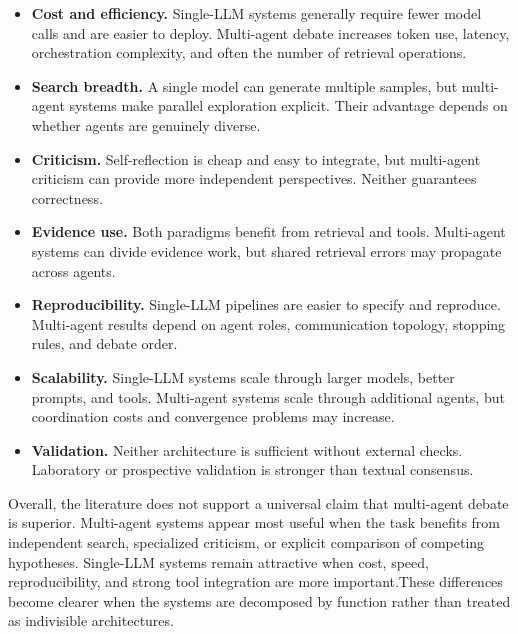 \documentclass[11pt]{article}
\begin{document}
\begin{itemize}
  \item \textbf{Cost and efficiency.} Single-LLM systems generally require fewer model calls and are
  easier to deploy. Multi-agent debate increases token use, latency, orchestration complexity, and
  often the number of retrieval operations.

  \item \textbf{Search breadth.} A single model can generate multiple samples, but multi-agent systems
  make parallel exploration explicit. Their advantage depends on whether agents are genuinely
  diverse.

  \item \textbf{Criticism.} Self-reflection is cheap and easy to integrate, but multi-agent criticism can
  provide more independent perspectives. Neither guarantees correctness.

  \item \textbf{Evidence use.} Both paradigms benefit from retrieval and tools. Multi-agent systems can
  divide evidence work, but shared retrieval errors may propagate across agents.

  \item \textbf{Reproducibility.} Single-LLM pipelines are easier to specify and reproduce. Multi-agent
  results depend on agent roles, communication topology, stopping rules, and debate order.

  \item \textbf{Scalability.} Single-LLM systems scale through larger models, better prompts, and tools.
  Multi-agent systems scale through additional agents, but coordination costs and convergence
  problems may increase.

  \item \textbf{Validation.} Neither architecture is sufficient without external checks. Laboratory or
  prospective validation is stronger than textual consensus.
\end{itemize}

Overall, the literature does not support a universal claim that multi-agent debate is superior.
Multi-agent systems appear most useful when the task benefits from independent search, specialized
criticism, or explicit comparison of competing hypotheses. Single-LLM systems remain attractive
when cost, speed, reproducibility, and strong tool integration are more important.These differences become clearer when the systems are decomposed by function rather than treated as indivisible architectures.
\end{document}
